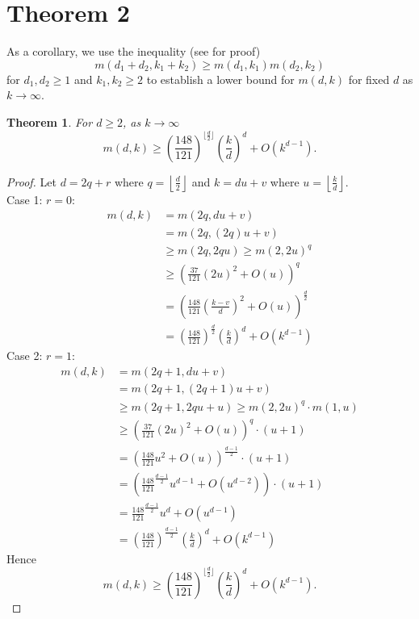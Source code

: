 \documentclass[11pt]{article}
\newtheorem{theorem}{Theorem}
\theoremstyle{definition}
\begin{document}
\section{Theorem 2}
As a corollary, we use the inequality (see \cite{Hsu-Jia:CombinatorialNetworks} for proof)
\[
m(d_1+d_2,k_1+k_2) \geq m(d_1,k_1)m(d_2,k_2) 
\]
for $d_1, d_2 \geq 1$ and $k_1, k_2 \geq 2$ to establish a lower bound for $m(d,k)$ for fixed $d$ as $k \to \infty$.
\begin{theorem}
For $d \geq 2$, as $k \to \infty$ 
\[
m(d,k) \geq \left(\frac{148}{121}\right)^{\lfloor \frac{d}{2}\rfloor}\left(\frac{k}{d}\right)^d + O(k^{d-1}).
\]
\end{theorem}
\begin{proof}
Let $d = 2q +r$ where $q =\displaystyle\left \lfloor \frac{d}{2}\right\rfloor$ and $k = du +v$ where $u =\displaystyle \left \lfloor \frac{k}{d}\right\rfloor$. \\
Case 1: $r = 0$:
\begin{align*}
m(d,k) &= m(2q, du +v)\\
&= m(2q, (2q)u +v)\\
&\geq m(2q, 2qu) \geq m(2, 2u)^q\\
&\geq \left(\frac{37}{121}(2u)^2+ O(u)\right)^q \\
&= \left(\frac{148}{121} \left(\frac{k-v}{d}\right) ^2+ O(u)\right)^{ \frac{d}{2}}\\
&= \left(\frac{148}{121}\right)^{ \frac{d}{2}}\left(\frac{k}{d}\right)^d + O(k^{d-1})
\end{align*}
Case 2: $r = 1$:
\begin{align*}
m(d,k) &= m(2q+1, du +v)\\
&= m(2q+1, (2q+1)u +v)\\
&\geq m(2q+1, 2qu + u) \geq m(2, 2u)^q \cdot m(1,u)\\
&\geq \left(\frac{37}{121}(2u)^2+ O(u)\right)^q \cdot (u+1) \\
&= \left(\frac{148}{121} u^2 + O(u)\right)^{ \frac{d-1}{2}} \cdot (u+1)\\
&= \left(\frac{148}{121}^{ \frac{d-1}{2}} u ^{d-1}+ O(u^{d-2})\right) \cdot (u+1)\\
&= \frac{148}{121}^{ \frac{d-1}{2}} u ^{d}+ O(u^{d-1})\\
&= \left(\frac{148}{121}\right)^{ \frac{d-1}{2}}\left(\frac{k}{d}\right)^d + O(k^{d-1})
\end{align*}
Hence 
\[
m(d,k) \geq \left(\frac{148}{121}\right)^{\lfloor \frac{d}{2}\rfloor}\left(\frac{k}{d}\right)^d + O(k^{d-1}).
\]
\end{proof}
\end{document}
